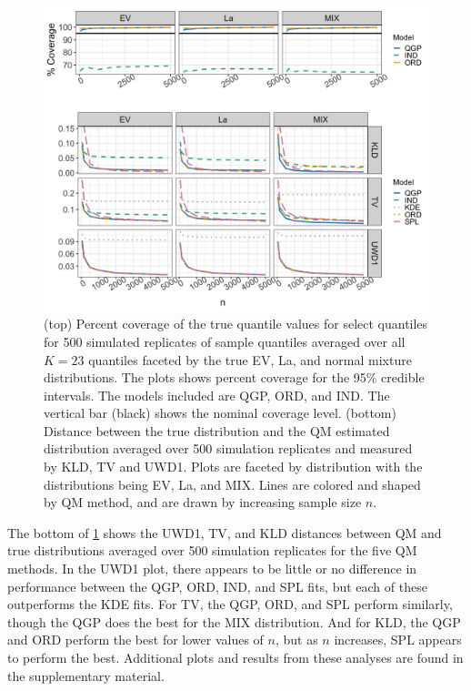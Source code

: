 \begin{figure}[hbt!]
\centering
\includegraphics[width=.9\linewidth]{Images/uk_cover_dist.png}
\caption{
(top) Percent coverage of the true quantile values for select quantiles for 
500 simulated replicates of sample quantiles averaged over all $K = 23$
quantiles faceted by the true EV, La, and normal mixture distributions.
The plots shows percent coverage for the 95\% credible intervals. The models 
included are QGP, ORD, and IND. The vertical bar (black) shows the nominal 
coverage level.
(bottom) Distance between the true distribution and the QM estimated 
distribution 
averaged over 500 simulation replicates and measured by KLD, TV and UWD1. 
Plots are faceted by distribution with the distributions being 
EV, La, and MIX. 
Lines are colored and shaped by QM method, and are drawn by increasing sample 
size $n$.}
\label{fig:uk_cover}
\end{figure}





The bottom of \ref{fig:uk_cover} shows the UWD1, TV, and KLD distances between 
QM and true distributions averaged over 500 simulation replicates for the 
five QM methods. In the UWD1 plot, there appears to be little or no difference
in performance between the QGP, ORD, IND, and SPL fits, but each of these
outperforms the KDE fits. For TV, the QGP, ORD, and SPL perform similarly, 
though the QGP does the best for the MIX distribution.
And for KLD, the QGP and ORD perform the best for lower values of $n$, but as
$n$ increases, SPL appears to perform the best. Additional plots and results
from these analyses are found in the supplementary material.

